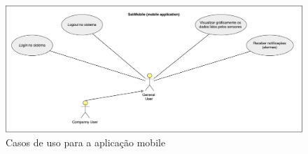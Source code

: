 \newpage
\begin{figure}[!htb]
	\centering
	\includegraphics[width=\linewidth]{esquemas/use-case-mobile.pdf}
	\caption{Casos de uso para a aplicação mobile}
	\label{useMobile}
\end{figure}





